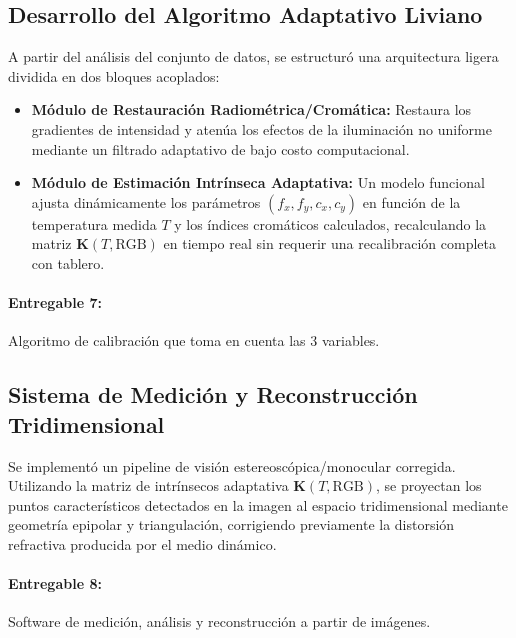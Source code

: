 \documentclass[12pt,letterpaper,spanish,twoside,openright]{report}
\begin{document}
\subsection{Desarrollo del Algoritmo Adaptativo Liviano}
A partir del análisis del conjunto de datos, se estructuró una arquitectura ligera dividida en dos bloques acoplados:
\begin{itemize}
    \item \textbf{Módulo de Restauración Radiométrica/Cromática:} Restaura los gradientes de intensidad y atenúa los efectos de la iluminación no uniforme mediante un filtrado adaptativo de bajo costo computacional.
    \item \textbf{Módulo de Estimación Intrínseca Adaptativa:} Un modelo funcional ajusta dinámicamente los parámetros $(f_x, f_y, c_x, c_y)$ en función de la temperatura medida $T$ y los índices cromáticos calculados, recalculando la matriz $\mathbf{K}(T, \text{RGB})$ en tiempo real sin requerir una recalibración completa con tablero.
\end{itemize}

\paragraph{Entregable 7:} Algoritmo de calibración que toma en cuenta las 3 variables.

\subsection{Sistema de Medición y Reconstrucción Tridimensional}
Se implementó un pipeline de visión estereoscópica/monocular corregida. Utilizando la matriz de intrínsecos adaptativa $\mathbf{K}(T, \text{RGB})$, se proyectan los puntos característicos detectados en la imagen al espacio tridimensional mediante geometría epipolar y triangulación, corrigiendo previamente la distorsión refractiva producida por el medio dinámico.

\paragraph{Entregable 8:} Software de medición, análisis y reconstrucción a partir de imágenes.
\end{document}
